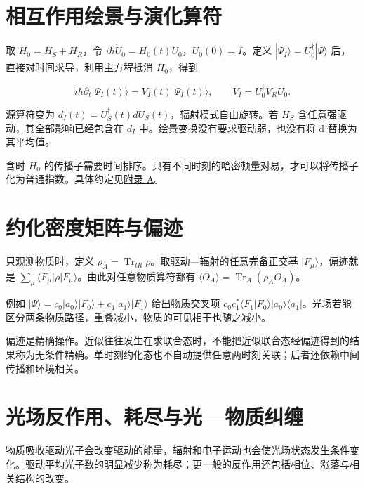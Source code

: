 \documentclass[UTF8,a4paper,zihao=-4,openany,fontset=fandol]{ctexbook}
\begin{document}
\section{相互作用绘景与演化算符}\label{sec:03:7}


取 $H_0=H_S+H_R$，令 $i\hbar\dot U_0=H_0(t)U_0$，$U_0(0)=I$。定义 $|\Psi_I\rangle=U_0^\dagger|\Psi\rangle$ 后，直接对时间求导，利用主方程抵消 $H_0$，得到



\begin{equation*}
i\hbar\partial_t|\Psi_I(t)\rangle=V_I(t)|\Psi_I(t)\rangle,
\qquad V_I=U_0^\dagger V_RU_0.
\tag{3.6}\label{eq:3.6}
\end{equation*}


源算符变为 $d_I(t)=U_S^\dagger(t)dU_S(t)$，辐射模式自由旋转。若 $H_S$ 含任意强驱动，其全部影响已经包含在 $d_I$ 中。绘景变换没有要求驱动弱，也没有将 d 替换为其平均值。



含时 $H_0$ 的传播子需要时间排序。只有不同时刻的哈密顿量对易，才可以将传播子化为普通指数。具体约定见\hyperref[ch:A]{附录 A}。



\section{约化密度矩阵与偏迹}\label{sec:03:8}


只观测物质时，定义 $\rho_A=\operatorname{Tr}_{lR}\rho$。取驱动—辐射的任意完备正交基 $|F_\mu\rangle$，偏迹就是 $\sum_\mu\langle F_\mu|\rho|F_\mu\rangle$。由此对任意物质算符都有 $\langle O_A\rangle=\operatorname{Tr}_A(\rho_AO_A)$。



例如 $|\Psi\rangle=c_0|a_0\rangle|F_0\rangle+c_1|a_1\rangle|F_1\rangle$ 给出物质交叉项 $c_0c_1^*\langle F_1|F_0\rangle|a_0\rangle\langle a_1|$。光场若能区分两条物质路径，重叠减小，物质的可见相干也随之减小。



偏迹是精确操作。近似往往发生在求联合态时，不能把近似联合态经偏迹得到的结果称为无条件精确。单时刻约化态也不自动提供任意两时刻关联；后者还依赖中间传播和环境相关。



\section{光场反作用、耗尽与光—物质纠缠}\label{sec:03:9}


物质吸收驱动光子会改变驱动的能量，辐射和电子运动也会使光场状态发生条件变化。驱动平均光子数的明显减少称为耗尽；更一般的反作用还包括相位、涨落与相关结构的改变。
\end{document}
